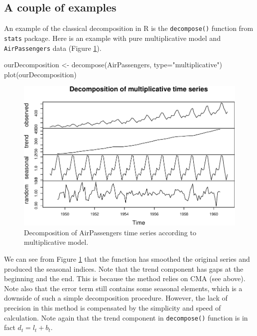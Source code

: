 \documentclass[
]{book}
\newenvironment{Shaded}{\begin{snugshade}}{\end{snugshade}}
\newcommand{\AttributeTok}[1]{\textcolor[rgb]{0.77,0.63,0.00}{#1}}
\newcommand{\FunctionTok}[1]{\textcolor[rgb]{0.00,0.00,0.00}{#1}}
\newcommand{\NormalTok}[1]{#1}
\newcommand{\OtherTok}[1]{\textcolor[rgb]{0.56,0.35,0.01}{#1}}
\newcommand{\StringTok}[1]{\textcolor[rgb]{0.31,0.60,0.02}{#1}}
\theoremstyle{definition}
\theoremstyle{definition}
\theoremstyle{definition}
\theoremstyle{definition}
\theoremstyle{remark}
\begin{document}
\hypertarget{a-couple-of-examples}{%
\subsection{A couple of examples}\label{a-couple-of-examples}}

An example of the classical decomposition in R is the \texttt{decompose()} function from \texttt{stats} package. Here is an example with pure multiplicative model and \texttt{AirPassengers} data (Figure \ref{fig:decomposeAirPassengers}).

\begin{Shaded}
\begin{Highlighting}[]
\NormalTok{ourDecomposition }\OtherTok{\textless{}{-}} \FunctionTok{decompose}\NormalTok{(AirPassengers,}
                              \AttributeTok{type=}\StringTok{"multiplicative"}\NormalTok{)}
\FunctionTok{plot}\NormalTok{(ourDecomposition)}
\end{Highlighting}
\end{Shaded}

\begin{figure}
\centering
\includegraphics{Svetunkov--2022----ADAM_files/figure-latex/decomposeAirPassengers-1.pdf}
\caption{\label{fig:decomposeAirPassengers}Decomposition of AirPassengers time series according to multiplicative model.}
\end{figure}

We can see from Figure \ref{fig:decomposeAirPassengers} that the function has smoothed the original series and produced the seasonal indices. Note that the trend component has gaps at the beginning and the end. This is because the method relies on CMA (see above). Note also that the error term still contains some seasonal elements, which is a downside of such a simple decomposition procedure. However, the lack of precision in this method is compensated by the simplicity and speed of calculation. Note again that the trend component in \texttt{decompose()} function is in fact \(d_t = l_{t}+b_{t}\).
\end{document}
